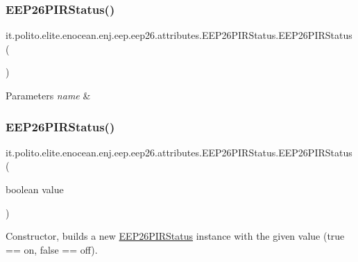\subsubsection{\texorpdfstring{E\+E\+P26\+P\+I\+R\+Status()}{EEP26PIRStatus()}\hspace{0.1cm}{\footnotesize\ttfamily [1/2]}}
{\footnotesize\ttfamily it.\+polito.\+elite.\+enocean.\+enj.\+eep.\+eep26.\+attributes.\+E\+E\+P26\+P\+I\+R\+Status.\+E\+E\+P26\+P\+I\+R\+Status (\begin{DoxyParamCaption}{ }\end{DoxyParamCaption})}


\begin{DoxyParams}{Parameters}
{\em name} & \\
\hline
\end{DoxyParams}
\hypertarget{classit_1_1polito_1_1elite_1_1enocean_1_1enj_1_1eep_1_1eep26_1_1attributes_1_1_e_e_p26_p_i_r_status_a212a736db1847ef9fa737baa19d8125e}{}\label{classit_1_1polito_1_1elite_1_1enocean_1_1enj_1_1eep_1_1eep26_1_1attributes_1_1_e_e_p26_p_i_r_status_a212a736db1847ef9fa737baa19d8125e} 
\subsubsection{\texorpdfstring{E\+E\+P26\+P\+I\+R\+Status()}{EEP26PIRStatus()}\hspace{0.1cm}{\footnotesize\ttfamily [2/2]}}
{\footnotesize\ttfamily it.\+polito.\+elite.\+enocean.\+enj.\+eep.\+eep26.\+attributes.\+E\+E\+P26\+P\+I\+R\+Status.\+E\+E\+P26\+P\+I\+R\+Status (\begin{DoxyParamCaption}\item[{boolean}]{value }\end{DoxyParamCaption})}

Constructor, builds a new \hyperlink{classit_1_1polito_1_1elite_1_1enocean_1_1enj_1_1eep_1_1eep26_1_1attributes_1_1_e_e_p26_p_i_r_status}{E\+E\+P26\+P\+I\+R\+Status} instance with the given value (true == on, false == off).


